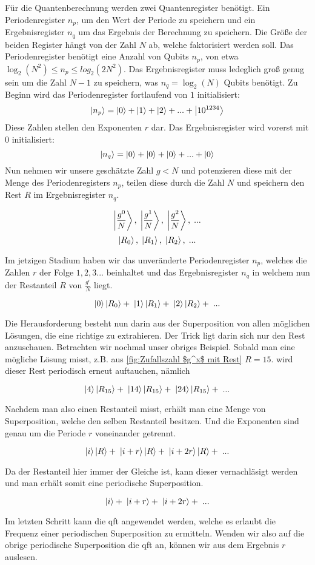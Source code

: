 Für die Quantenberechnung \cite[S.1-2]{amicoExperimentalStudyShor2019} werden zwei Quantenregister benötigt. Ein Periodenregister $n_p$, 
um den Wert der Periode zu speichern und ein Ergebnisregister $n_q$ um das Ergebnis der Berechnung zu speichern. 
Die Größe der beiden Register hängt von der Zahl $N$ ab, welche faktorisiert werden soll. 
Das Periodenregister benötigt eine Anzahl von Qubits $n_p$, von etwa $\log_2(N^2) \le n_p \le log_2(2N^2)$. 
Das Ergebnisregister muss ledeglich groß genug sein um die Zahl $N-1$ zu speichern, was $n_q = \log_2(N)$ Qubits benötigt.
Zu Beginn wird das Periodenregister fortlaufend von $1$ initialisiert: 
$$\ket{n_p} = \ket{0} + \ket{1} + \ket{2} + ... + \ket{10^{1234}}$$
Diese Zahlen stellen den Exponenten $r$ dar. Das Ergebnisregister wird vorerst mit $0$ initialisiert: 
$$\ket{n_q} = \ket{0} + \ket{0} + \ket{0} + ... + \ket{0}$$
Nun nehmen wir unsere geschätzte Zahl $g < N$ und potenzieren diese mit der Menge des Periodenregisters $n_p$, teilen diese durch die Zahl $N$ 
und speichern den Rest $R$ im Ergebnisregister $n_q$.

$$\ket{\frac{g^0}{N}},\;\ket{\frac{g^1}{N}},\;\ket{\frac{g^2}{N}},\;...$$
$$\ket{R_0},\; \ket{R_1},\; \ket{R_2},\;...$$

Im jetzigen Stadium haben wir das unveränderte Periodenregister $n_p$, welches die Zahlen $r$ der Folge $1, 2, 3...$ beinhaltet 
und das Ergebnisregister $n_q$ in welchem nun der Restanteil $R$ von $\frac{g^r}{N}$ liegt.

$$\ket{0}\ket{R_0} + \;\ket{1}\ket{R_1} + \;\ket{2}\ket{R_2} + \;...$$

Die Herausforderung besteht nun darin aus der Superposition von allen möglichen Lösungen, die eine richtige zu extrahieren. 
Der Trick ligt darin sich nur den Rest anzuschauen. Betrachten wir nochmal unser obriges Beispiel. Sobald man eine mögliche Lösung misst, 
z.B. aus \ref{fig:Zufallszahl $g^x$ mit Rest} $R = 15$. wird dieser Rest periodisch erneut auftauchen, nämlich

$$\ket{4}\ket{R_{15}} + \;\ket{14}\ket{R_{15}} + \;\ket{24}\ket{R_{15}} + \;...$$

Nachdem man also einen Restanteil misst, erhält man eine Menge von Superposition, welche den selben Restanteil besitzen. 
Und die Exponenten sind genau um die Periode $r$ voneinander getrennt.

$$\ket{i}\ket{R} + \;\ket{i+r}\ket{R} + \;\ket{i+2r}\ket{R} + \;...$$

Da der Restanteil hier immer der Gleiche ist, kann dieser vernachläsigt werden und man erhält somit eine periodische Superposition.

$$\ket{i} + \;\ket{i+r} + \;\ket{i+2r} + \;...$$

Im letzten Schritt kann die \ac{qft} angewendet werden, welche es erlaubt die Frequenz einer periodischen Superposition zu ermitteln. \cite[S. 2]{amicoExperimentalStudyShor2019}
Wenden wir also auf die obrige periodische Superposition die \ac{qft} an, können wir aus dem Ergebnis $r$ auslesen.\\